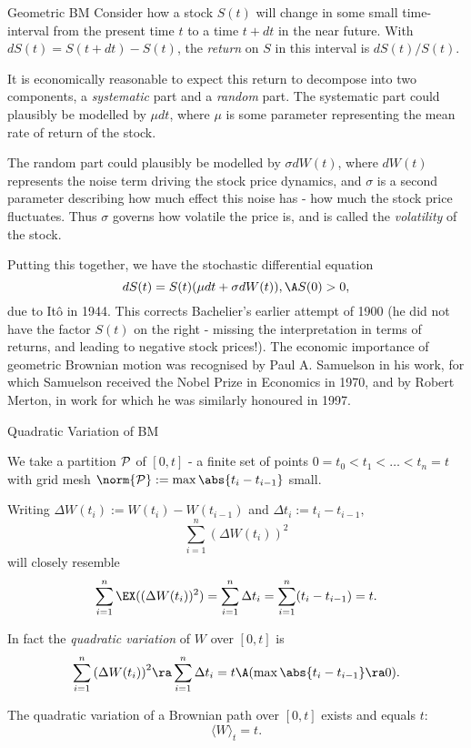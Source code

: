 Geometric BM
	Consider how a stock $S(t)$
	will change in some small time-interval from the present time $t$
	to a time $t+dt$ in the near future. 
	With $dS(t) =  S(t+dt)-S(t)$, the {\it return} on $S$ in this
	interval is $dS(t)/S(t)$.  
 
	It is economically reasonable to expect
	this return to decompose into two components, a {\it systematic}
	part and a {\it random} part. The systematic part could plausibly
	be modelled by $\mu dt$, where $\mu$ is some parameter
	representing the mean rate of return of the stock.
 
	The random
	part could plausibly be modelled by $\sigma dW(t)$, where $dW(t)$
	represents the noise term driving the stock price dynamics, and
	$\sigma$ is a second parameter describing how much effect this
	noise has - how much the stock price fluctuates. Thus $\sigma$
	governs how volatile the price is, and is called the {\it
	volatility} of the
	stock. 

	Putting this together, we have the stochastic differential
	equation
		\begin{equation}\label{GBM}
		dS(t) = S(t) (\mu dt + \sigma dW(t)), \A S(0) > 0,
		\end{equation}
	due to It\^{o} in 1944.  This corrects Bachelier's earlier attempt
	of 1900 (he did not have the factor $S(t)$ on the right - missing
	the interpretation in terms of returns, and leading to negative
	stock prices!).  The economic importance of geometric
	Brownian motion was recognised by Paul A. Samuelson in his work, for which Samuelson received the Nobel
	Prize in Economics in 1970, and by Robert Merton, in work for which he was similarly
	honoured in 1997.


Quadratic Variation of BM

	 We take a partition
	$\cal P$ of $[0,t]$ - a finite set of points $0 = t_0 < t_1 <
	\ldots < t_n = t$ with grid mesh $\norm{\cal P}:= \max\abs{t_i -
	t_{i-1}}$ small.
  
	Writing $ \Delta W(t_i) := W(t_i) -
	W(t_{i-1})$ and $ \Delta t_i  := t_i - t_{i-1}, $
	$$ \sum_{i=1}^n (\Delta W(t_i))^2 $$ will closely resemble $$
	\sum_{i=1}^n \EX((\Delta W(t_i))^2)= \sum_{i=1}^n \Delta t_i =
	\sum_{i=1}^n (t_i - t_{i-1}) =t. $$ 
	
	In fact the {\it quadratic variation} of $W$ over
	$[0,t]$ is 
	$$
	\sum_{i=1}^n {(\Delta W(t_i))}^2 \ra \sum_{i=1}^n \Delta t_i = t
	\A (\max \abs{t_i - t_{i-1}} \ra 0). $$

	\begin{theorem} [L\'evy]
		The quadratic variation of a Brownian path over $[0,t]$ exists and
		equals $t$:
		$$
		\langle W \rangle_t =t.
		$$
		\end{theorem}



